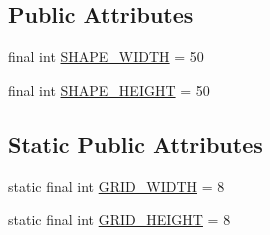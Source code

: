\subsection*{Public Attributes}
\begin{DoxyCompactItemize}
\item 
final int \hyperlink{class_display_1_1_display_t_t_t_aba4c92bd721d0fb8718fbf9ed9d837e4}{S\+H\+A\+P\+E\+\_\+\+W\+I\+D\+T\+H} = 50
\item 
final int \hyperlink{class_display_1_1_display_t_t_t_ad7c69ef4532bf358596b4a2d09c22fbc}{S\+H\+A\+P\+E\+\_\+\+H\+E\+I\+G\+H\+T} = 50
\end{DoxyCompactItemize}
\subsection*{Static Public Attributes}
\begin{DoxyCompactItemize}
\item 
static final int \hyperlink{class_display_1_1_display_t_t_t_ac07e05126f3b772dd62b3276defc0b4b}{G\+R\+I\+D\+\_\+\+W\+I\+D\+T\+H} = 8
\item 
static final int \hyperlink{class_display_1_1_display_t_t_t_a863d5b47363b01c44552068cd9ee832f}{G\+R\+I\+D\+\_\+\+H\+E\+I\+G\+H\+T} = 8
\end{DoxyCompactItemize}
